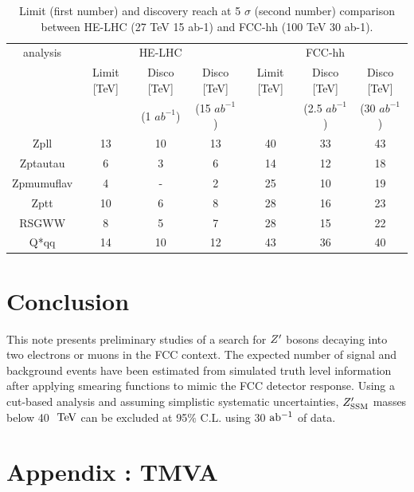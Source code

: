 \documentclass{cernrep}
\begin{document}
\begin{table}[!htb]\centering
\begin{tabular}{|c|c|c|c|c|c|c|}
\hline
\hline
analysis   & \multicolumn{3}{c|}{HE-LHC} & \multicolumn{3}{c|}{FCC-hh} \\
           & Limit [TeV] & Disco [TeV]   & Disco [TeV]    & Limit [TeV] & Disco [TeV] & Disco [TeV] \\
           &             & (1 $ab^{-1}$) & (15 $ab^{-1}$) &             & (2.5 $ab^{-1}$) & (30 $ab^{-1}$)  \\
\hline
Zpll       & 13 & 10 & 13 & 40 & 33 & 43 \\
Zptautau   &  6 &  3 &  6 & 14 & 12 & 18 \\
Zpmumuflav &  4 &  - &  2 & 25 & 10 & 19 \\
Zptt       & 10 &  6 &  8 & 28 & 16 & 23 \\
RSGWW      &  8 &  5 &  7 & 28 & 15 & 22 \\
Q*qq       & 14 & 10 & 12 & 43 & 36 & 40 \\
\hline
\hline
\end{tabular}
\caption{Limit (first number) and discovery reach at 5 $\sigma$ (second number) comparison between HE-LHC (27 TeV 15 ab-1) and FCC-hh (100 TeV 30 ab-1).}
\label{tab:27vs100}
\end{table}


\section{Conclusion}
This note presents preliminary studies of a search for $Z^{\prime}$ 
bosons decaying into two electrons or muons in the FCC context. The expected number 
of signal and background events have been estimated from simulated truth level information 
after applying smearing functions to mimic the FCC detector response.
Using a cut-based analysis and assuming simplistic systematic uncertainties, $Z^{\prime}_{\mathrm{SSM}}$
masses below 40 $\TeV$ can be excluded at 95$\%$ C.L. 
using 30 $\mbox{ab$^{-1}$}{}$ of data. 
\clearpage
\newpage

\appendix

\section{ Appendix : TMVA}
\label{appendix:tmva}
\end{document}
